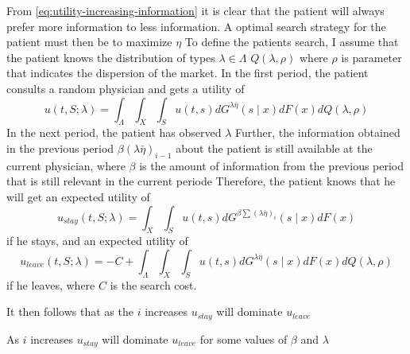 \documentclass[10pt,a4paper]{article} 					%
\begin{document}
From \cref{eq:utility-increasing-information} it is clear that the patient will always prefer more information to less information. A optimal search strategy for the patient must then be to maximize \(\eta\)  To define the patients search, I assume that the patient knows the distribution of types \(\lambda\in \Lambda\)  \(Q(\lambda, \rho)\)  where \(\rho\) is parameter that indicates the dispersion of the market. In the first period, the patient consults a random physician and gets a utility of
\[
	u(t,S;\lambda)=\int_\Lambda\int_X\int_S u(t,s)dG^{\lambda\bar{\eta}}(s\mid x)dF(x)dQ(\lambda,\rho)
\]
In the next period, the patient has observed \(\lambda\)  Further, the information obtained in the previous period \(\beta(\lambda\bar{\eta})_{i-1}\) about the patient is still available at the current physician, where \(\beta\) is the amount of information from the previous period that is still relevant in the current periode Therefore, the patient knows that he will get an expected utility of
\[
		u_{stay}(t,S;\lambda)=\int_X\int_S u(t,s)dG^{\beta\sum(\lambda\bar{\eta})_{i}}(s\mid x)dF(x)
\]
if he stays, and an expected utility of
\[
	u_{leave}(t,S;\lambda)=-C+\int_\Lambda\int_X\int_S u(t,s)dG^{\lambda\bar{\eta}}(s\mid x)dF(x)dQ(\lambda,\rho)
\]
if he leaves, where \(C\)  is the search cost.

It then follows that as the \(i\) increases \(u_{stay}\) will dominate \(u_{leave}\)
\begin{thm}
 As \(i\) increases \(u_{stay}\) will dominate \(u_{leave}\) for some values of \(\beta\) and \(\lambda\)
\end{thm}

\printbibliography%

\end{document}
